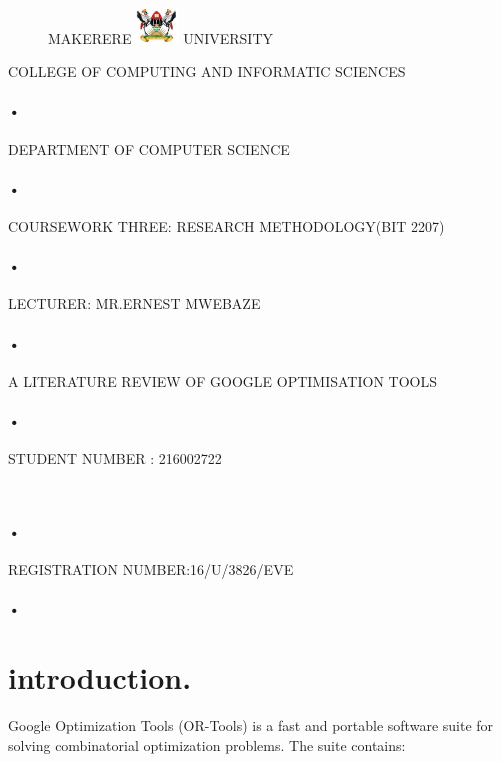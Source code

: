\documentclass[09pt,a4paper]{article}
\begin{document}
\begin{titlepage}
 \begin{figure}[h]
  \centerline{\small MAKERERE 
  \includegraphics[width=0.1\textwidth]{muklog} UNIVERSITY}
\end{figure}
\centerline{COLLEGE OF COMPUTING AND INFORMATIC SCIENCES}
\paragraph{•}
\centerline{DEPARTMENT OF COMPUTER SCIENCE\\}
\paragraph{•}

\centerline{COURSEWORK THREE: RESEARCH METHODOLOGY(BIT 2207)\\}
\paragraph{•}
\centerline{LECTURER: MR.ERNEST MWEBAZE}
\paragraph{•}
         \centerline{A LITERATURE REVIEW OF GOOGLE OPTIMISATION TOOLS}
          \author{ATUHAIRE DIANA}
 \paragraph{•}
\centerline{STUDENT NUMBER : 216002722}\
\paragraph{•}
\centerline{REGISTRATION NUMBER:16/U/3826/EVE}
\paragraph{•}
\end{titlepage}

\tableofcontents
\newpage
{}
\section{introduction.}
Google Optimization Tools (OR-Tools) is a fast and portable software suite for solving combinatorial optimization problems. The suite contains:
\end{document}
